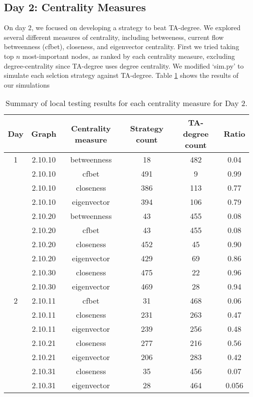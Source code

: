 \documentclass[letterpaper, 11pt]{article}
\begin{document}
\subsection{Day 2: Centrality Measures}
On day 2, we focused on developing a strategy to beat TA-degree. We explored several different measures of centrality, including betweeness, current flow betweenness (cfbet), closeness, and eigenvector centrality. First we tried taking top $n$ most-important nodes, as ranked by each centrality measure, excluding degree-centrality since TA-degree uses degree centrality. We modified `sim.py' to simulate each selction strategy against TA-degree. Table \ref{table:day2} shows the results of our simulations

\begin{table}\centering
\begin{tabular}{cccccc}
Day & Graph & Centrality measure & Strategy count & TA-degree count & Ratio \\ \hline
\toprule
\multirow{1}{*}{1}
& 2.10.10 & betweenness & 18 & 482 & 0.04 \\
& 2.10.10 & cfbet & 491 & 9 & 0.99 \\ 
& 2.10.10 & closeness & 386 & 113 & 0.77 \\
& 2.10.10 & eigenvector & 394 & 106 & 0.79\\ \cmidrule{2-6}

& 2.10.20 & betweenness & 43 & 455 & 0.08 \\
& 2.10.20 & cfbet & 43 & 455 & 0.08 \\ 
& 2.10.20 & closeness & 452 & 45 & 0.90\\
& 2.10.20 & eigenvector & 429 & 69 & 0.86\\ \cmidrule{2-6}

& 2.10.30 & closeness & 475 & 22 & 0.96\\
& 2.10.30 & eigenvector & 469 & 28 & 0.94\\
\midrule

\multirow{1}{*}{2}
& 2.10.11 & cfbet & 31 & 468 & 0.06\\
& 2.10.11 & closeness & 231 & 263 & 0.47 \\
& 2.10.11 & eigenvector & 239 & 256 & 0.48\\ \cmidrule{2-6}

& 2.10.21 & closeness & 277 & 216 & 0.56 \\
& 2.10.21 & eigenvector & 206 & 283 & 0.42\\ \cmidrule{2-6}

& 2.10.31 & closeness & 35 & 456 & 0.07 \\
& 2.10.31 & eigenvector & 28 & 464 & 0.056 \\
\bottomrule
\end{tabular}
\caption{Summary of local testing results for each centrality measure for Day 2.}
\label{table:day2}
\end{table}
\end{document}
